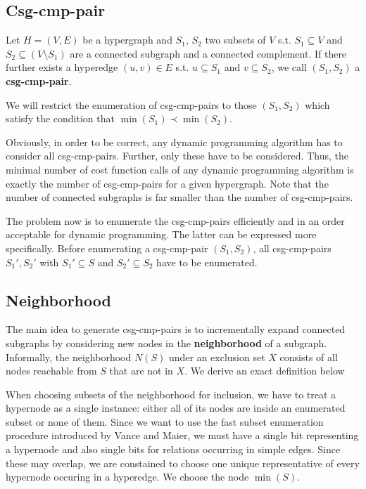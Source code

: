 \documentclass[11pt]{article}
\begin{document}
\subsection{Csg-cmp-pair}
\label{sec:org317a7fe}
\begin{definition}
Let \(H=(V,E)\) be a hypergraph and \(S_1\), \(S_2\) two subsets of \(V\) s.t. \(S_1\subseteq V\) and
\(S_2\subseteq(V\setminus S_1)\) are a connected subgraph and a connected complement. If there further
exists a hyperedge \((u,v)\in E\) s.t. \(u\subseteq S_1\) and \(v\subseteq S_2\), we call
\((S_1,S_2)\) a \textbf{csg-cmp-pair}.
\end{definition}

We will restrict the enumeration of csg-cmp-pairs to those \((S_1,S_2)\) which satisfy the condition
that \(\min(S_1)\prec\min(S_2)\).

Obviously, in order to be correct, any dynamic programming algorithm has to consider all
csg-cmp-pairs. Further, only these have to be considered. Thus, the minimal number of cost function
calls of any dynamic programming algorithm is exactly the number of csg-cmp-pairs for a given
hypergraph. Note that the number of connected subgraphs is far smaller than the number of
csg-cmp-pairs.

The problem now is to enumerate the csg-cmp-pairs efficiently and in an order
acceptable for dynamic programming. The latter can be expressed more specifically. Before enumerating
a csg-cmp-pair \((S_1,S_2)\), all csg-cmp-pairs \(S_1',S_2'\) with \(S_1'\subseteq S\) and
\(S_2'\subseteq S_2\) have to be enumerated.
\subsection{Neighborhood}
\label{sec:orgd506c6d}
The main idea to generate csg-cmp-pairs is to incrementally expand connected subgraphs by considering
new nodes in the \textbf{neighborhood} of a subgraph. Informally, the neighborhood \(N(S)\) under an exclusion
set \(X\) consists of all nodes reachable from \(S\) that are not in \(X\). We derive an exact
definition below

When choosing subsets of the neighborhood for inclusion, we have to treat a hypernode as a single
instance: either all of its nodes are inside an enumerated subset or none of them. Since we want to
use the fast subset enumeration procedure introduced by Vance and Maier, we must have a single bit
representing a hypernode and also single bits for relations occurring in simple edges. Since these may
overlap, we are constained to choose one unique representative of every hypernode occuring in a
hyperedge. We choose the node \(\min(S)\).
\end{document}
